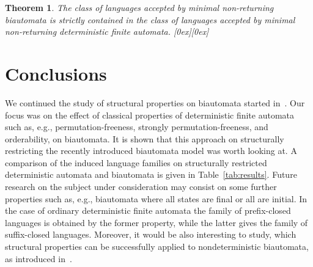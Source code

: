 \documentclass[submission]{eptcs}
\newcommand*{\qed}{\raisebox{0.5ex}[0ex][0ex]{\framebox[1ex][l]{}}}
\newtheorem{theorem}{Theorem}
\begin{document}
\begin{theorem}
  The class of languages accepted by \emph{minimal} non-returning biautomata
  is strictly contained in the class of languages accepted by \emph{minimal}
  non-returning deterministic finite automata. \hfill \qed
\end{theorem}

\section{Conclusions}
\label{sec:conclusions}

We continued the study of structural properties on biautomata started
in~\cite{HoJa13c,KlPo12a,KlPo12}. Our focus was on the effect of
classical properties of deterministic finite automata such as, e.g.,
permutation-freeness, strongly permutation-freeness, and orderability,
on biautomata. It is shown that this approach on structurally
restricting the recently introduced biautomata model was worth looking
at. A comparison of the induced language families on structurally
restricted deterministic automata and biautomata is given in
Table~\ref{tab:results}. Future research on the subject under
consideration may consist on some further properties such as, e.g.,
biautomata where all states are final or all are initial. In the case
of ordinary deterministic finite automata the family of prefix-closed
languages is obtained by the former property, while the latter gives
the family of suffix-closed languages. Moreover, it would be also
interesting to study, which structural properties can be successfully
applied to nondeterministic biautomata, as introduced
in~\cite{HoJa13a}.
\end{document}
